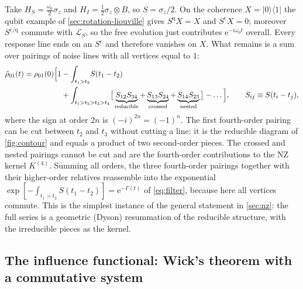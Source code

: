 \documentclass[11pt]{article}
\newcommand{\Lc}{\mathcal{L}}
\newcommand{\ee}{\mathrm{e}}
\newcommand{\cl}{\mathrm{c}}
\newcommand{\qu}{\mathrm{q}}
\newcommand{\ket}[1]{|#1\rangle}
\newcommand{\bra}[1]{\langle#1|}
\begin{document}
\begin{keybox}
Take $H_S=\frac{\omega_0}{2}\sigma_z$ and $H_I=\frac12\sigma_z\otimes B$, so $S=\sigma_z/2$. On the
coherence $X=\ket0\bra1$ the qubit example of \cref{sec:rotation-liouville} gives
$S^\qu X=X$ and $S^\cl X=0$; moreover $S^{\cl/\qu}$ commute with $\Lc_S$, so the free
evolution just contributes $\ee^{-i\omega_0t}$ overall. Every response line ends on an
$S^\cl$ and therefore vanishes on $X$. What remains is a sum over pairings of noise lines
with all vertices equal to $1$:
\begin{align}
  \tilde\rho_{01}(t)=\rho_{01}(0)\Big[1
  &-\int_{t_1>t_2}\!S(t_1-t_2)\notag\\
  &+\int_{t_1>t_2>t_3>t_4}\!\big[\underbrace{S_{12}S_{34}}_{\text{reducible}}
    +\underbrace{S_{13}S_{24}}_{\text{crossed}}
    +\underbrace{S_{14}S_{23}}_{\text{nested}}\big]-\dots\Big],\qquad S_{ij}\equiv S(t_i-t_j),
\end{align}
where the sign at order $2n$ is $(-i)^{2n}=(-1)^n$. The first fourth-order pairing can be
cut between $t_2$ and $t_3$ without cutting a line: it is the reducible diagram of
\cref{fig:contour} and equals a product of two second-order pieces. The crossed and
nested pairings cannot be cut and are the fourth-order contributions to the NZ kernel
$K^{(4)}$. Summing all orders, the three fourth-order pairings together with their
higher-order relatives reassemble into the exponential
$\exp[-\int_{t_1>t_2}S(t_1-t_2)]=\ee^{-\Gamma(t)}$ of \cref{eq:filter}, because here all
vertices commute. This is the simplest instance of the general statement in \cref{sec:nz}:
the full series is a geometric (Dyson) resummation of the reducible structure, with the
irreducible pieces as the kernel.
\end{keybox}

\subsection{The influence functional: Wick's theorem with a commutative system}
\label{sec:FV-derivation}
\end{document}
